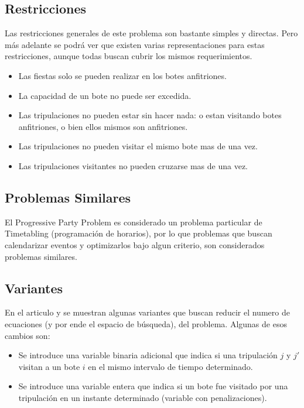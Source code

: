 \documentclass[letter, 10pt]{article}
\begin{document}
\subsection{Restricciones}
Las restricciones generales de este problema son bastante simples y directas. Pero más adelante se podrá ver que existen varias representaciones para estas restricciones, aunque todas buscan cubrir los mismos requerimientos.

\begin{itemize}
\item Las fiestas solo se pueden realizar en los botes anfitriones.
\item La capacidad de un bote no puede ser excedida.
\item Las tripulaciones no pueden estar sin hacer nada: o estan visitando botes anfitriones, o bien ellos mismos son anfitriones.
\item Las tripulaciones no pueden visitar el mismo bote mas de una vez.
\item Las tripulaciones visitantes no pueden cruzarse mas de una vez.
\end{itemize}

\subsection{Problemas Similares}
El Progressive Party Problem es considerado un problema particular de Timetabling (programación de horarios), por lo que problemas que buscan calendarizar eventos y optimizarlos bajo algun criterio, son considerados problemas similares.

\subsection{Variantes}
En el articulo \cite{FirstPublication} y \cite{PPPAsMIP} se muestran algunas variantes que buscan reducir el numero de ecuaciones (y por ende el espacio de búsqueda), del problema. Algunas de esos cambios son:

\begin{itemize}
\item Se introduce una variable binaria adicional que indica si una tripulación $j$ y $j'$ visitan a un bote $i$ en el mismo intervalo de tiempo determinado.
\item Se introduce una variable entera que indica si un bote fue visitado por una tripulación en un instante determinado (variable con penalizaciones).
\end{itemize}
\end{document}
